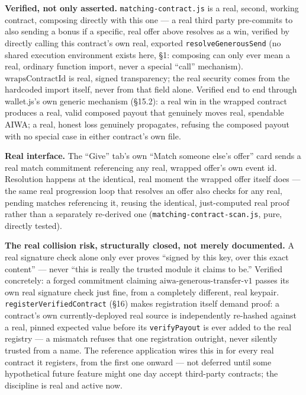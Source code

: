 \documentclass[10pt]{article}
\newcommand{\code}[1]{\texttt{\small #1}}
\begin{document}
\textbf{Verified, not only asserted.} \code{matching-contract.js} is a real, second, working contract, composing directly with this one --- a real third party pre-commits to also sending a bonus if a specific, real offer above resolves as a win, verified by directly calling this contract's own real, exported \code{resolveGenerousSend} (no shared execution environment exists here, \S1: composing can only ever mean a real, ordinary function import, never a special ``call'' mechanism). $\mathrm{wrapsContractId}$ is real, signed transparency; the real security comes from the hardcoded import itself, never from that field alone. Verified end to end through wallet.js's own generic mechanism (\S15.2): a real win in the wrapped contract produces a real, valid composed payout that genuinely moves real, spendable AIWA; a real, honest loss genuinely propagates, refusing the composed payout with no special case in either contract's own file.

\textbf{Real interface.} The ``Give'' tab's own ``Match someone else's offer'' card sends a real match commitment referencing any real, wrapped offer's own event id. Resolution happens at the identical, real moment the wrapped offer itself does --- the same real progression loop that resolves an offer also checks for any real, pending matches referencing it, reusing the identical, just-computed real proof rather than a separately re-derived one (\code{matching-contract-scan.js}, pure, directly tested).

\textbf{The real collision risk, structurally closed, not merely documented.} A real signature check alone only ever proves ``signed by this key, over this exact content'' --- never ``this is really the trusted module it claims to be.'' Verified concretely: a forged commitment claiming $\mathrm{aiwa\text{-}generous\text{-}transfer\text{-}v1}$ passes its own real signature check just fine, from a completely different, real keypair. \code{registerVerifiedContract} (\S16) makes registration itself demand proof: a contract's own currently-deployed real source is independently re-hashed against a real, pinned expected value before its \code{verifyPayout} is ever added to the real registry --- a mismatch refuses that one registration outright, never silently trusted from a name. The reference application wires this in for every real contract it registers, from the first one onward --- not deferred until some hypothetical future feature might one day accept third-party contracts; the discipline is real and active now.
\end{document}

